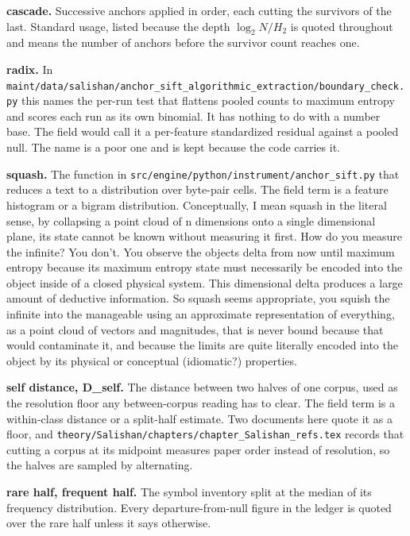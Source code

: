 \textbf{cascade.} Successive anchors applied in order, each cutting the survivors of the last. Standard usage, listed because the depth \(\log_2 N / H_2\) is quoted throughout and means the number of anchors before the survivor count reaches one.

\textbf{radix.} In \texttt{maint/\allowbreak{}data/\allowbreak{}salishan/\allowbreak{}anchor\_\allowbreak{}sift\_\allowbreak{}algorithmic\_\allowbreak{}extraction/\allowbreak{}boundary\_\allowbreak{}check.\allowbreak{}py} this names the per-run test that flattens pooled counts to maximum entropy and scores each run as its own binomial. It has nothing to do with a number base. The field would call it a per-feature standardized residual against a pooled null. The name is a poor one and is kept because the code carries it.

\textbf{squash.} The function in \texttt{src/\allowbreak{}engine/\allowbreak{}python/\allowbreak{}instrument/\allowbreak{}anchor\_\allowbreak{}sift.\allowbreak{}py} that reduces a text to a distribution over byte-pair cells. The field term is a feature histogram or a bigram distribution. Conceptually, I mean squash in the literal sense, by collapsing a point cloud of n dimensions onto a single dimensional plane, its state cannot be known without measuring it first. How do you measure the infinite? You don't. You observe the objects delta from now until maximum entropy because its maximum entropy state must necessarily be encoded into the object inside of a closed physical system. This dimensional delta produces a large amount of deductive information. So squash seems appropriate, you squish the infinite into the manageable using an approximate representation of everything, as a point cloud of vectors and magnitudes, that is never bound because that would contaminate it, and because the limits are quite literally encoded into the object by its physical or conceptual (idiomatic?) properties.

\textbf{self distance, D\_self.} The distance between two halves of one corpus, used as the resolution floor any between-corpus reading has to clear. The field term is a within-class distance or a split-half estimate. Two documents here quote it as a floor, and \texttt{theory/\allowbreak{}Salishan/\allowbreak{}chapters/\allowbreak{}chapter\_\allowbreak{}Salishan\_\allowbreak{}refs.\allowbreak{}tex} records that cutting a corpus at its midpoint measures paper order instead of resolution, so the halves are sampled by alternating.

\textbf{rare half, frequent half.} The symbol inventory split at the median of its frequency distribution. Every departure-from-null figure in the ledger is quoted over the rare half unless it says otherwise.


